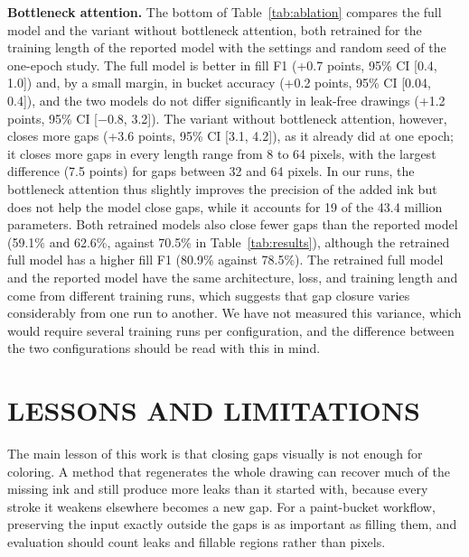 \documentclass{IEEEcsmag}
\providecommand{\DIFaddtex}[1]{{\color{blue}#1}} %
\providecommand{\DIFaddend}{} %
\providecommand{\DIFaddtex}[1]{\DIFaddtex{#1}} %
\providecommand{\DIFadd}[1]{\texorpdfstring{\DIFaddtex{#1}}{#1}} %
\begin{document}
\DIFadd{\textbf{Bottleneck attention.} The bottom of Table~\ref{tab:ablation} compares the
full model and the variant without bottleneck attention, both retrained for the
training length of the reported model with the settings and random seed of the
one-epoch study. The full model is better in fill F1 (+0.7 points, 95\% CI }[\DIFadd{0.4,
1.0}]\DIFadd{) and, by a small margin, in bucket accuracy (+0.2 points, 95\% CI }[\DIFadd{0.04, 0.4}]\DIFadd{),
and the two models do not differ significantly in leak-free drawings (+1.2 points,
95\% CI }[\DIFadd{$-0.8$, 3.2}]\DIFadd{). The variant without bottleneck attention, however, closes
more gaps (+3.6 points, 95\% CI }[\DIFadd{3.1, 4.2}]\DIFadd{), as it already did at one epoch; it
closes more gaps in every length range from 8 to 64 pixels, with the largest
difference (7.5 points) for gaps between 32 and 64 pixels. In our runs, the
bottleneck attention thus slightly improves the precision of the added ink but does
not help the model close gaps, while it accounts for 19 of the 43.4 million
parameters. Both retrained models also close fewer gaps than the reported model
(59.1\% and 62.6\%, against 70.5\% in Table~\ref{tab:results}), although the
retrained full model has a higher fill F1 (80.9\% against 78.5\%). The retrained full
model and the reported model have the same architecture, loss, and training length
and come from different training runs, which suggests that gap closure varies
considerably from one run to another. We have not measured this variance, which
would require several training runs per configuration, and the difference between
the two configurations should be read with this in mind.
}

\DIFaddend \section{LESSONS AND LIMITATIONS}

The main lesson of this work is that closing gaps visually is not enough for
coloring. A method that regenerates the whole drawing can recover much of the
missing ink and still produce more leaks than it started with, because every stroke
it weakens elsewhere becomes a new gap. For a paint-bucket workflow, preserving the
input exactly outside the gaps is as important as filling them, and evaluation should
count leaks and fillable regions rather than pixels.
\end{document}
